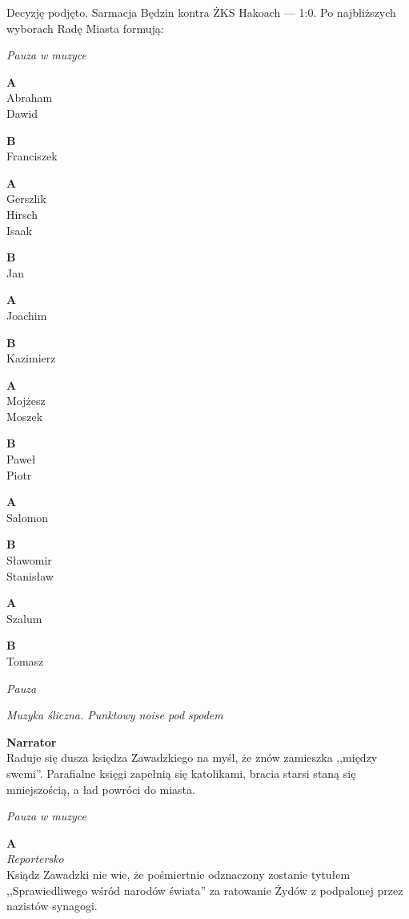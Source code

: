 \documentclass[11pt,a4paper,oneside]{article}
\begin{document}
Decyzję podjęto. Sarmacja Będzin kontra ŻKS Hakoach --- 1:0. Po
najbliższych wyborach Radę Miasta formują:

{\color{light-gray} \emph{Pauza w muzyce}}

\textbf{A}\\
Abraham\\
Dawid

\textbf{B}\\
Franciszek

\textbf{A}\\
Gerszlik\\
Hirsch\\
Isaak

\textbf{B}\\
Jan

\textbf{A}\\
Joachim

\textbf{B}\\
Kazimierz

\textbf{A}\\
Mojżesz\\
Moszek

\textbf{B}\\
Paweł\\
Piotr

\textbf{A}\\
Salomon

\textbf{B}\\
Sławomir\\
Stanisław

\textbf{A}\\
Szalum

\textbf{B}\\
Tomasz


{\color{light-gray} \emph{Pauza}}


{\color{light-gray} \emph{Muzyka śliczna. Punktowy noise pod spodem}}

\textbf{Narrator}\\
Raduje się dusza księdza Zawadzkiego na myśl, że znów zamieszka
,,między swemi''. Parafialne księgi zapełnią się katolikami, 
bracia starsi staną się mniejszością, a ład powróci do miasta.

{\color{light-gray} \emph{Pauza w muzyce}}

\textbf{A}\\
{\color{light-gray} \emph{Reportersko}}\\
Ksiądz Zawadzki nie wie, że pośmiertnie odznaczony zostanie tytułem
,,Sprawiedliwego wśród narodów świata'' za ratowanie Żydów
z podpalonej przez nazistów synagogi.
\end{document}
